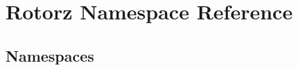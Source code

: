 \hypertarget{namespace_rotorz}{}\section{Rotorz Namespace Reference}
\label{namespace_rotorz}
\subsection*{Namespaces}
\begin{DoxyCompactItemize}
\end{DoxyCompactItemize}
